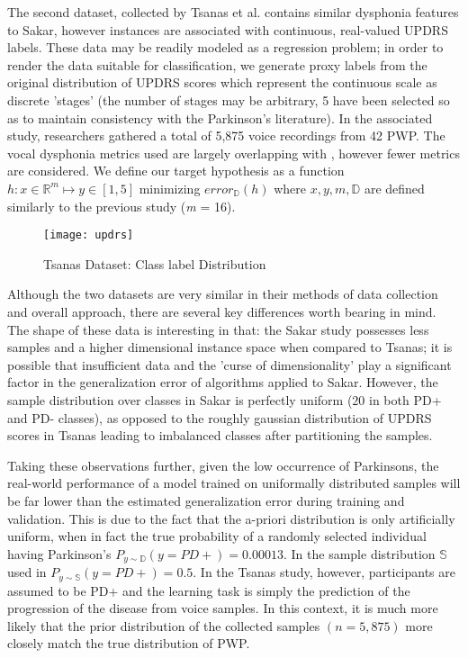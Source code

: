 \documentclass[12pt]{article}
\begin{document}
The second dataset, collected by Tsanas et al.\cite{Tsanas2010} contains similar dysphonia features to Sakar, however instances are associated with continuous, real-valued UPDRS labels. These data may be readily modeled as a regression problem; in order to render the data suitable for classification, we generate proxy labels from the original distribution of UPDRS scores which represent the continuous scale as discrete 'stages' (the number of stages may be arbitrary, 5 have been selected so as to maintain consistency with the Parkinson's literature). In the associated study, researchers gathered a total of 5,875 voice recordings from 42 PWP. The vocal dysphonia metrics used are largely overlapping with \cite{Sakar2013}, however fewer metrics are considered. We define our target hypothesis as a function $ h : x \in \mathbb{R}^m \mapsto y \in [1,5] $ minimizing $error_\mathbb{D}(h)$ where $x,y,m,\mathbb{D}$ are defined similarly to the previous study (\textit{m} = 16).

\begin{figure}
    \centering
    \texttt{[image: updrs]}
    \caption{Tsanas Dataset: Class label Distribution}
\end{figure}

Although the two datasets are very similar in their methods of data collection and overall approach, there are several key differences worth bearing in mind. The shape of these data is interesting in that: the Sakar study possesses less samples and a higher dimensional instance space when compared to Tsanas; it is possible that insufficient data and the 'curse of dimensionality' play a significant factor in the generalization error of algorithms applied to Sakar. However, the sample distribution over classes in Sakar is perfectly uniform (20 in both PD+ and PD- classes), as opposed to the roughly gaussian distribution of UPDRS scores in Tsanas leading to imbalanced classes after partitioning the samples.

Taking these observations further, given the low occurrence of Parkinsons, the real-world performance of a model trained on uniformally distributed samples will be far lower than the estimated generalization error during training and validation. This is due to the fact that the a-priori distribution is only artificially uniform, when in fact the true probability of a randomly selected individual having Parkinson's $P_{y \sim \mathbb{D}}(y = PD+) = 0.00013$. In the sample distribution $\mathbb{S}$ used in\cite{Sakar2013} $P_{y \sim \mathbb{S}}(y = PD+) = 0.5$. In the Tsanas study, however, participants are assumed to be PD+ and the learning task is simply the prediction of the progression of the disease from voice samples. In this context, it is much more likely that the prior distribution of the collected samples $(n=5,875)$ more closely match the true distribution of PWP.
\end{document}
